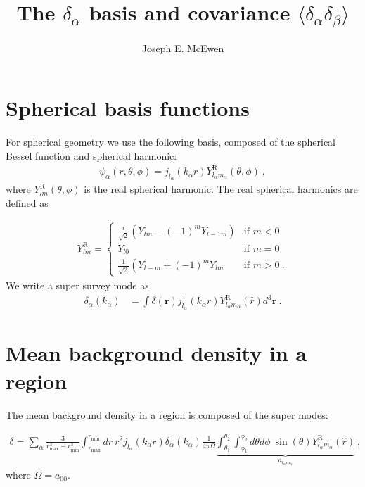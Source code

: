 \documentclass[11pt, oneside]{article}   	%
\title{The $\delta_\alpha$ basis and covariance $\langle \delta_\alpha \delta_\beta \rangle$}
\author{Joseph E. McEwen}
\newcommand{\sph}[2]{Y^\text{R}_{l_#1 m_#1}(\hat{#2})}
\newcommand{\jl}[1]{j_{l_#1}}
\begin{document}
\maketitle

\section{Spherical basis functions}
For spherical geometry we use the following basis, composed of the spherical Bessel function and spherical harmonic:
\begin{align} 
\psi_\alpha(r, \theta, \phi) = j_{l_\alpha}(k_\alpha r) Y^\text{R}_{l_\alpha m_\alpha}(\theta, \phi) ~, 
\end{align} 
where $Y^\text{R}_{lm}(\theta, \phi) $ is the real spherical harmonic. The real spherical harmonics are defined as 

\begin{align}
Y^\text{R}_{lm} =
\begin{cases} \frac{i}{\sqrt{2}} \left( Y_{lm}  - (-1)^m Y_{l-1m} \right)& \text{if }  m < 0 \\
Y_{l0} & \text{if } m=0 \\
\frac{1}{\sqrt{2}}\left( Y_{l-m} + (-1)^mY_{lm} & \text{if } m > 0 ~.
\end{cases}
\end{align} 
We write a super survey mode as 
\begin{align}
\delta_\alpha(k_\alpha)& = \int \delta(\mathbf{r}) \jl{\alpha}(k_\alpha r) \sph{\alpha}{r} d^3 \mathbf{r}~. 
\end{align}

\section{Mean background density in a region}
The mean background density in a region is composed of the super modes:

\begin{align}
\label{bar_delta}
\bar{\delta}= \displaystyle \sum_\alpha \frac{3}{r_\text{max}^3 - r_\text{min}^3} \int_{r_\text{max}}^ {r_\text{min} }dr ~ r^2 j_{l_\alpha}(k_\alpha r) \delta_\alpha(k_\alpha) \frac{1}{4\pi \Omega} \underbrace{ \int_{\theta_1}^{\theta_2 }\int_{\phi_1}^{\phi_2} d  \theta d \phi ~\sin(\theta)\sph{\alpha}{r}}_{a_{l_\alpha m_\alpha}} ~,
\end{align}
where $\Omega= a_{00}$. 
\end{document}

